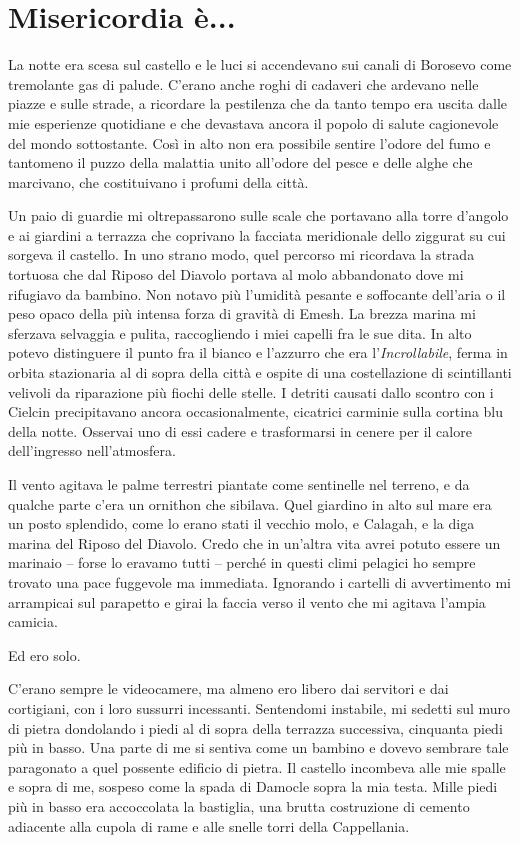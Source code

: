 \chapter{Misericordia è...}

La notte era scesa sul castello e le luci si accendevano sui canali di
Borosevo come tremolante gas di palude. C'erano anche roghi di cadaveri
che ardevano nelle piazze e sulle strade, a ricordare la pestilenza che
da tanto tempo era uscita dalle mie esperienze quotidiane e che
devastava ancora il popolo di salute cagionevole del mondo sottostante.
Così in alto non era possibile sentire l'odore del fumo e tantomeno il
puzzo della malattia unito all'odore del pesce e delle alghe che
marcivano, che costituivano i profumi della città.

Un paio di guardie mi oltrepassarono sulle scale che portavano alla
torre d'angolo e ai giardini a terrazza che coprivano la facciata
meridionale dello ziggurat su cui sorgeva il castello. In uno strano
modo, quel percorso mi ricordava la strada tortuosa che dal Riposo del
Diavolo portava al molo abbandonato dove mi rifugiavo da bambino. Non
notavo più l'umidità pesante e soffocante dell'aria o il peso opaco
della più intensa forza di gravità di Emesh. La brezza marina mi
sferzava selvaggia e pulita, raccogliendo i miei capelli fra le sue
dita. In alto potevo distinguere il punto fra il bianco e l'azzurro che
era l'\emph{Incrollabile}, ferma in orbita stazionaria al di sopra della
città e ospite di una costellazione di scintillanti velivoli da
riparazione più fiochi delle stelle. I detriti causati dallo scontro con
i Cielcin precipitavano ancora occasionalmente, cicatrici carminie sulla
cortina blu della notte. Osservai uno di essi cadere e trasformarsi in
cenere per il calore dell'ingresso nell'atmosfera.

Il vento agitava le palme terrestri piantate come sentinelle nel
terreno, e da qualche parte c'era un ornithon che sibilava. Quel
giardino in alto sul mare era un posto splendido, come lo erano stati il
vecchio molo, e Calagah, e la diga marina del Riposo del Diavolo. Credo
che in un'altra vita avrei potuto essere un marinaio -- forse lo eravamo
tutti -- perché in questi climi pelagici ho sempre trovato una pace
fuggevole ma immediata. Ignorando i cartelli di avvertimento mi
arrampicai sul parapetto e girai la faccia verso il vento che mi agitava
l'ampia camicia.

Ed ero solo.

C'erano sempre le videocamere, ma almeno ero libero dai servitori e dai
cortigiani, con i loro sussurri incessanti. Sentendomi instabile, mi
sedetti sul muro di pietra dondolando i piedi al di sopra della terrazza
successiva, cinquanta piedi più in basso. Una parte di me si sentiva
come un bambino e dovevo sembrare tale paragonato a quel possente
edificio di pietra. Il castello incombeva alle mie spalle e sopra di me,
sospeso come la spada di Damocle sopra la mia testa. Mille piedi più in
basso era accoccolata la bastiglia, una brutta costruzione di cemento
adiacente alla cupola di rame e alle snelle torri della Cappellania.

